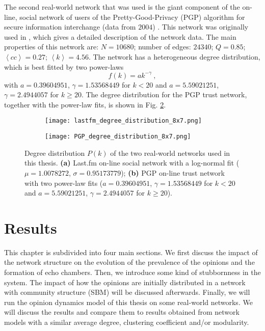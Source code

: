 \documentclass[11 pt , letterpaper , twoside , openright]{book}
\begin{document}
The second real-world network that was used is the giant component of the on-line, social network of users of the Pretty-Good-Privacy (PGP) algorithm for secure information interchange (data from $2004$) \cite{ICON}. This network was originally used in \cite{Boguna2004}, which gives a detailed description of the network data. The main properties of this network are: $N = 10680$; number of edges: $24340$; $Q = 0.85$; $\left<cc\right> = 0.27$; $\left<k\right> = 4.56$. The network has a heterogeneous degree distribution, which is best fitted by two power-laws
\begin{equation}
 f(k) = a k^{-\gamma} \ ,
\end{equation}
with $a = 0.39604951$, $\gamma = 1.53568449$ for $k < 20$ and $a = 5.59021251$, $\gamma = 2.4944057$ for $k \geqslant 20$. The degree distribution for the PGP trust network, together with the power-law fits, is shown in Fig. \ref{deg_distr_pgp}. 

\begin{figure}[H]
  \begin{subfigure}[b]{0.49\textwidth}
    \caption{}
    \texttt{[image: lastfm\_degree\_distribution\_8x7.png]}
    \label{deg_distr_lastfm}
  \end{subfigure}
  \begin{subfigure}[b]{0.49\textwidth}
    \caption{}
    \texttt{[image: PGP\_degree\_distribution\_8x7.png]}
    \label{deg_distr_pgp}
  \end{subfigure}
  \captionsetup{format=plain}
  \caption[Degree distribution $P(k)$ of the two real-world networks used in this thesis.]{Degree distribution $P(k)$ of the two real-world networks used in this thesis. \textbf{(a)} Last.fm on-line social network with a log-normal fit ($\mu = 1.0078272$, $\sigma = 0.95173779$); \textbf{(b)} PGP on-line trust network with two power-law fits ($a = 0.39604951$, $\gamma = 1.53568449$ for $k < 20$ and $a = 5.59021251$, $\gamma = 2.4944057$ for $k \geqslant 20$).}
\label{deg_distr_real_network}
\end{figure}

\chapter{Results}

This chapter is subdivided into four main sections. We first discuss the impact of the network structure on the evolution of the prevalence of the opinions and the formation of echo chambers. Then, we introduce some kind of stubbornness in the system. The impact of how the opinions are initially distributed in a network with community structure (SBM) will be discussed afterwards. Finally, we will run the opinion dynamics model of this thesis on some real-world networks. We will discuss the results and compare them to results obtained from network models with a similar average degree, clustering coefficient and/or modularity.
\end{document}
